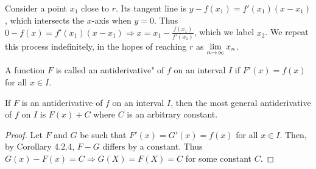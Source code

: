 \documentclass[a4paper,11pt]{article}
\begin{document}
\begin{outline}
    \begin{justification}
      Consider a point \(x_1\) close to \(r\). Its tangent line is \(y - f(x_1) = f'(x_1)(x - x_1)\), which
      intersects the \(x\)-axis when \(y = 0\). Thus \(0 - f(x) = f'(x_1)(x-x_1) \Rightarrow x = x_1 - 
      \frac{f(x_1)}{f'(x_1)}\), which we label \(x_2\). We repeat this process indefinitely, in the hopes of reaching
      \(r\) as \(\lim\limits_{n\rightarrow \infty^{}}x_n\).
    \end{justification}
    
    A function \(F\) is called an antiderivative" of \(f\) on an interval \(I\) if \(F'(x) = f(x)\) for all \(x \in I\).
    
    If \(F\) is an antiderivative of \(f\) on an interval \(I\), then the most general antiderivative of \(f\) on \(I\) 
    is \(F(x) + C\) where \(C\) is an arbitrary constant.
    
    \begin{proof}
      Let \(F\) and \(G\) be such that \(F'(x) = G'(x) = f(x)\) for all \(x \in I\). Then, by Corollary 4.2.4, \(F-G\)
      differs by a constant. Thus \(G(x)-F(x)=C \Rightarrow G(X) = F(X) = C\) for some constant \(C\).
    \end{proof}
    
\end{outline}
\end{document}
